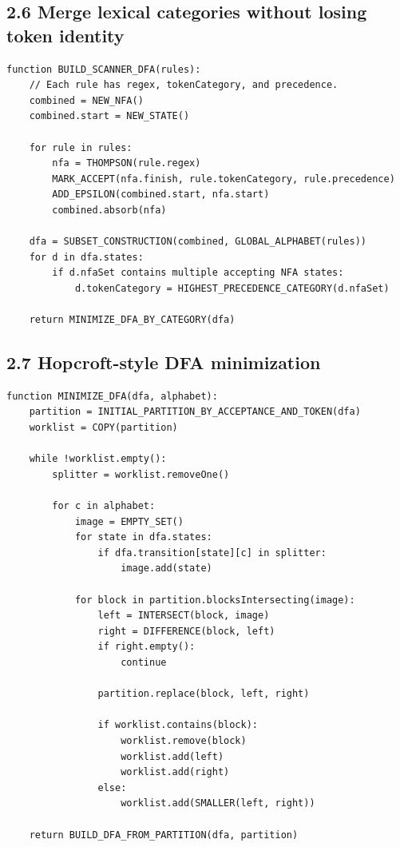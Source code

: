\documentclass[10pt,letterpaper]{article}
\begin{document}
\subsection*{2.6 Merge lexical categories without losing token identity}

\begin{verbatim}
function BUILD_SCANNER_DFA(rules):
    // Each rule has regex, tokenCategory, and precedence.
    combined = NEW_NFA()
    combined.start = NEW_STATE()

    for rule in rules:
        nfa = THOMPSON(rule.regex)
        MARK_ACCEPT(nfa.finish, rule.tokenCategory, rule.precedence)
        ADD_EPSILON(combined.start, nfa.start)
        combined.absorb(nfa)

    dfa = SUBSET_CONSTRUCTION(combined, GLOBAL_ALPHABET(rules))
    for d in dfa.states:
        if d.nfaSet contains multiple accepting NFA states:
            d.tokenCategory = HIGHEST_PRECEDENCE_CATEGORY(d.nfaSet)

    return MINIMIZE_DFA_BY_CATEGORY(dfa)
\end{verbatim}

\subsection*{2.7 Hopcroft-style DFA minimization}

\begin{verbatim}
function MINIMIZE_DFA(dfa, alphabet):
    partition = INITIAL_PARTITION_BY_ACCEPTANCE_AND_TOKEN(dfa)
    worklist = COPY(partition)

    while !worklist.empty():
        splitter = worklist.removeOne()

        for c in alphabet:
            image = EMPTY_SET()
            for state in dfa.states:
                if dfa.transition[state][c] in splitter:
                    image.add(state)

            for block in partition.blocksIntersecting(image):
                left = INTERSECT(block, image)
                right = DIFFERENCE(block, left)
                if right.empty():
                    continue

                partition.replace(block, left, right)

                if worklist.contains(block):
                    worklist.remove(block)
                    worklist.add(left)
                    worklist.add(right)
                else:
                    worklist.add(SMALLER(left, right))

    return BUILD_DFA_FROM_PARTITION(dfa, partition)
\end{verbatim}
\end{document}
